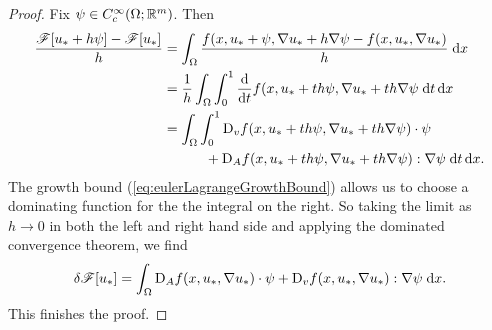 \begin{proof}
    Fix $\psi \in C_c^\infty(\Omega;\mathbb{R}^m)$. Then 
    \begin{equation} \begin{aligned}
        \frac{\mathscr{F}[u_* + h\psi] - \mathscr{F}[u_*]}{h} &= \int_\Omega \frac{f(x,u_* + \psi,\nabla u_* + h\nabla\psi
                                                                        - f(x,u_*,\nabla u_*)}{h} \; \mathrm{d} x               \\
                                                  &= \frac{1}{h} \int_\Omega \int_0^1 \frac{\mathrm{d}}{\mathrm{d} t} f(x,u_* + th\psi,
                                                                            \nabla u_* + th\nabla\psi \; \mathrm{d} t \, \mathrm{d} x   \\
                                                  &= \int_\Omega \int_0^1 \mathrm{D}_v f(x,u_* + th\psi,
                                                        \nabla u_* + th\nabla\psi ) \cdot \psi                          \\
                                                  &\hspace{30pt} + \mathrm{D}_A f(x,u_* + th\psi, \nabla u_* 
                                                        + th\nabla\psi ) : \nabla \psi \; \mathrm{d} t \, \mathrm{d} x.
    \end{aligned} \end{equation}
    The growth bound (\ref{eq:eulerLagrangeGrowthBound}) allows us to choose a dominating function for the the integral on the right. So taking the limit as $h \to 0$ in both the left and right hand side and applying the dominated convergence theorem, we find 
    \begin{equation} 
        \delta\mathscr{F}[u_*] = \int_\Omega \mathrm{D}_A f(x,u_*,\nabla u_*) \cdot \psi + \mathrm{D}_v f(x,u_*,\nabla u_*) : \nabla \psi \; \mathrm{d} x.
    \end{equation}
    This finishes the proof.
\end{proof}
